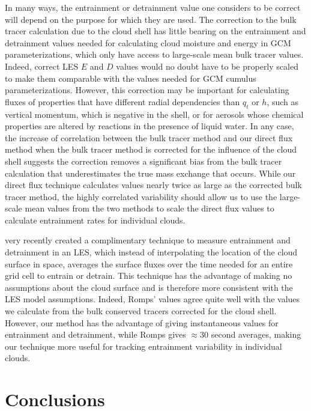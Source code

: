 \documentclass[12pt]{article}
\begin{document}
In many ways, the entrainment or detrainment value one considers to be correct 
will depend on the purpose for which they are used.  The correction to the bulk 
tracer calculation due to the cloud shell has little bearing on the entrainment 
and detrainment values needed for calculating cloud moisture and energy in GCM 
parameterizations, which only have access to large-scale mean bulk tracer 
values.  Indeed, correct LES $E$ and $D$ values would no doubt have to be 
properly scaled to make them comparable with the values needed for GCM cumulus 
parameterizations.  However, this correction may be important for calculating 
fluxes of properties that have different radial dependencies than $q_t$ or $h$, 
such as vertical momentum, which is negative in the shell, or for aerosols 
whose chemical properties are altered by reactions in the presence of liquid 
water.  In any case, the increase of correlation between the bulk tracer method
and our direct flux method when the bulk tracer method is corrected for the 
influence of the cloud shell suggests the correction removes a significant bias 
from the bulk tracer calculation that underestimates the true mass exchange that
occurs.  While our direct flux technique calculates values nearly twice as 
large as the corrected bulk tracer method, the highly correlated variability 
should allow us to use the large-scale mean values from the two methods to 
scale the direct flux values to calculate entrainment rates for individual 
clouds.

\cite{Romps2010} very recently created a complimentary technique to measure 
entrainment and detrainment in an LES, which instead of interpolating the 
location of the cloud surface in space, averages the surface fluxes over the 
time needed for an entire grid cell to entrain or detrain.  This technique has 
the advantage of making no assumptions about the cloud surface and is therefore 
more consistent with the LES model assumptions.  Indeed, Romps' values agree 
quite well with the values we calculate from the bulk conserved tracers 
corrected for the cloud shell.  However, our method has the advantage of giving 
instantaneous values for entrainment and detrainment, while Romps gives 
$\approx$30 second averages, making our technique more useful for tracking 
entrainment variability in individual clouds.


\section{Conclusions}
\end{document}
